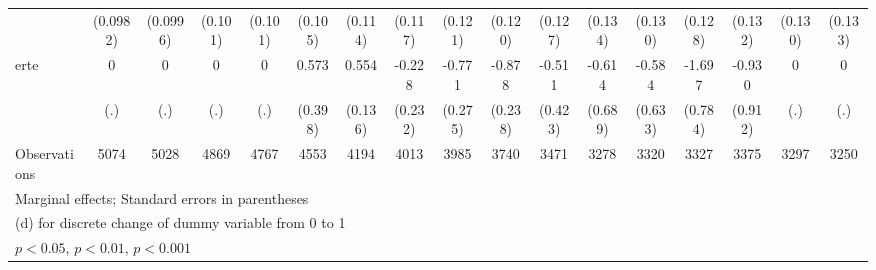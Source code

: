 {\begin{tabular}{l*{16}{c}}
                    &    (0.0982)         &    (0.0996)         &     (0.101)         &     (0.101)         &     (0.105)         &     (0.114)         &     (0.117)         &     (0.121)         &     (0.120)         &     (0.127)         &     (0.134)         &     (0.130)         &     (0.128)         &     (0.132)         &     (0.130)         &     (0.133)         \\
[1em]
erte                &           0         &           0         &           0         &           0         &       0.573         &       0.554\sym{***}&      -0.228         &      -0.771\sym{**} &      -0.878\sym{***}&      -0.511         &      -0.614         &      -0.584         &      -1.697\sym{*}  &      -0.930         &           0         &           0         \\
                    &         (.)         &         (.)         &         (.)         &         (.)         &     (0.398)         &     (0.136)         &     (0.232)         &     (0.275)         &     (0.238)         &     (0.423)         &     (0.689)         &     (0.633)         &     (0.784)         &     (0.912)         &         (.)         &         (.)         \\
\hline
Observations        &        5074         &        5028         &        4869         &        4767         &        4553         &        4194         &        4013         &        3985         &        3740         &        3471         &        3278         &        3320         &        3327         &        3375         &        3297         &        3250         \\
\hline\hline
\multicolumn{17}{l}{\footnotesize Marginal effects; Standard errors in parentheses}\\
\multicolumn{17}{l}{\footnotesize  (d) for discrete change of dummy variable from 0 to 1}\\
\multicolumn{17}{l}{\footnotesize \sym{*} \(p<0.05\), \sym{**} \(p<0.01\), \sym{***} \(p<0.001\)}\\
\end{tabular}
}
